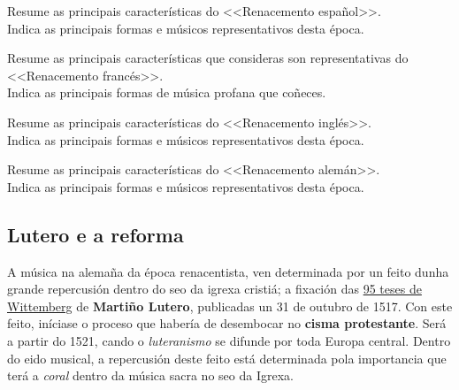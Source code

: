 \begin{ejercicio}
Resume as principais características do <<Renacemento español>>.\\
Indica as principais formas e músicos representativos desta época.
\par
\vspace{9cm}
\end{ejercicio}

\begin{ejercicio}
Resume as principais características que consideras son representativas do <<Renacemento francés>>.\\
Indica as principais formas de música profana que coñeces.
\par
\vspace{5cm}
\end{ejercicio}

\begin{ejercicio}
Resume as principais características do <<Renacemento inglés>>.\\
Indica as principais formas e músicos representativos desta época.
\par
\vspace{5cm}
\end{ejercicio}

\begin{ejercicio}
Resume as principais características do <<Renacemento alemán>>.\\
Indica as principais formas e músicos representativos desta época.
\par
\vspace{5cm}
\end{ejercicio}


\subsection*{Lutero e a reforma}

A música na alemaña da época renacentista, ven determinada por un feito dunha grande repercusión dentro do seo da igrexa cristiá; a fixación das \href{http://es.wikipedia.org/wiki/Las_95_tesis}{95 teses de Wittemberg} de \textbf{Martiño Lutero}, publicadas un 31 de outubro de 1517. 
Con este feito, iníciase o proceso que habería de desembocar no \textbf{cisma protestante}. Será a partir do 1521, cando o \emph{luteranismo} se difunde por toda Europa central. Dentro do eido musical, a repercusión deste feito está determinada pola importancia que terá a \emph{coral} dentro da música sacra no seo da Igrexa.

